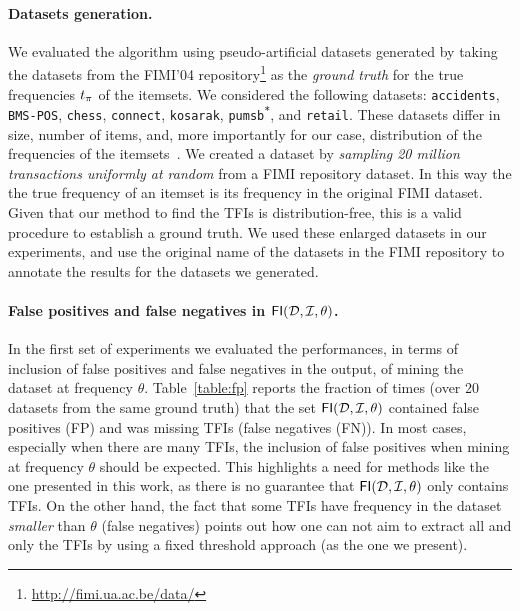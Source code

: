 \paragraph*{Datasets generation.}\label{sec:dsgen}
We evaluated the algorithm using pseudo-artificial datasets generated by taking the datasets from the FIMI'04
repository\footnote{\url{http://fimi.ua.ac.be/data/}} as the \emph{ground truth} for the true frequencies
$t_\pi$ of the itemsets. We considered the following datasets:
\texttt{accidents}, %
\texttt{BMS-POS}, \texttt{chess},
\texttt{connect}, \texttt{kosarak}, \texttt{pumsb\textsuperscript{*}}, and
\texttt{retail}. %
These datasets differ in size, number of
items, and, more importantly for our case, distribution of the frequencies of the
itemsets~\citep{GoethalsZ04}. We
created a dataset by \emph{sampling 20 million transactions uniformly at random} from a FIMI
repository dataset. In this way the
the true frequency of an itemset is its frequency in the
original FIMI dataset. Given that our method to find the TFIs is
distribution-free, this is a valid procedure to establish a ground truth. We used
these enlarged datasets in our experiments, and use the original name of the
datasets in the FIMI repository to annotate the results for the datasets we generated.

\paragraph*{False positives and false negatives in
$\mathsf{FI}({\cal D},{\cal I},\theta)$.}
In the first set of experiments we evaluated the performances, in terms of
inclusion of false positives and false negatives in the output, of mining the
dataset at frequency $\theta$. Table~\ref{table:fp} reports
the fraction of times (over 20 datasets from the same
ground truth) that the set $\mathsf{FI}({\cal D},{\cal I},\theta)$ contained false positives
(FP) and was missing TFIs (false negatives (FN)). In most cases, especially when there are
many TFIs, the inclusion of false positives when mining at frequency $\theta$
should be expected. This highlights a need for methods like the one presented in
this work, as there is no guarantee that $\mathsf{FI}({\cal D},{\cal I},\theta)$
only contains TFIs. On the other hand,
the fact that some TFIs have frequency in the dataset \emph{smaller} than
$\theta$ (false negatives) points out how one can not aim to extract all and
only the TFIs by using a fixed threshold approach (as the one we present).

